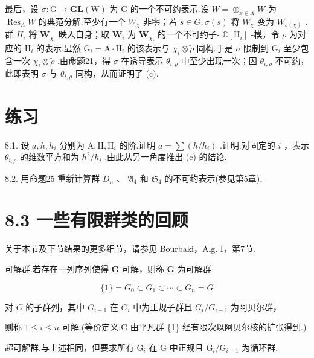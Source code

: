 \documentclass[10pt]{article}
\begin{document}
最后，设 \(\sigma  : \mathrm{G} \rightarrow  \mathbf{{GL}}\left( \mathrm{W}\right)\) 为 \(\mathrm{G}\) 的一个不可约表示.设 \(W = { \oplus  }_{x \in  X}W\) 为 \({\operatorname{Res}}_{A}W\) 的典范分解.至少有一个 \({W}_{\chi }\) 非零；若 \(s \in  G,\sigma \left( s\right)\) 将 \({W}_{\chi }\) 变为 \({W}_{s\left( \chi \right) }\) .群 \({H}_{i}\) 将 \({\mathbf{W}}_{{\chi }_{i}}\) 映入自身；取 \({\mathbf{W}}_{i}\) 为 \({\mathbf{W}}_{{\chi }_{i}}\) 的一个不可约子- \(\mathbb{C}\left\lbrack  {\mathrm{H}}_{i}\right\rbrack\) -模，令 \(\rho\) 为对应的 \({\mathrm{H}}_{i}\) 的表示.显然 \({\mathrm{G}}_{i} = \mathrm{A} \cdot  {\mathrm{H}}_{i}\) 的该表示与 \({\chi }_{i} \otimes  \widetilde{\rho }\) 同构.于是 \(\sigma\) 限制到 \({\mathrm{G}}_{i}\) 至少包含一次 \({\chi }_{i} \otimes  \widetilde{\rho }\) .由命题21，得 \(\sigma\) 在诱导表示 \({\theta }_{i,\rho }\) 中至少出现一次；因 \({\theta }_{i,\rho }\) 不可约，此即表明 \(\sigma\) 与 \({\theta }_{i,\rho }\) 同构，从而证明了 (c).

\section*{练习}

8.1. 设 \(a,h,{h}_{i}\) 分别为 \(\mathrm{A},\mathrm{H},{\mathrm{H}}_{i}\) 的阶.证明 \(a = \sum \left( {h/{h}_{i}}\right)\) .证明:对固定的 \(i\) ，表示 \({\theta }_{i,\rho }\) 的维数平方和为 \({h}^{2}/{h}_{i}\) .由此从另一角度推出 (c) 的结论.

8.2. 用命题25 重新计算群 \({D}_{n}\) 、 \({\mathfrak{A}}_{4}\) 和 \({\mathfrak{S}}_{4}\) 的不可约表示(参见第5章).

\section*{8.3 一些有限群类的回顾}

关于本节及下节结果的更多细节，请参见 Bourbaki，Alg. I，第7节.

可解群.若存在一列序列使得 \(\mathbf{G}\) 可解，则称 \(\mathbf{G}\) 为可解群

\[
\{ 1\}  = {G}_{0} \subset  {G}_{1} \subset  \cdots  \subset  {G}_{n} = G
\]

对 \(G\) 的子群列，其中 \({G}_{i - 1}\) 在 \({G}_{i}\) 中为正规子群且 \({G}_{i}/{G}_{i - 1}\) 为阿贝尔群，

则称 \(1 \leq  i \leq  n\) 可解.(等价定义:G 由平凡群 \{1\} 经有限次以阿贝尔核的扩张得到.)

超可解群.与上述相同，但要求所有 \({\mathrm{G}}_{i}\) 在 \(\mathrm{G}\) 中正规且 \({\mathrm{G}}_{i}/{\mathrm{G}}_{i - 1}\) 为循环群.
\end{document}
